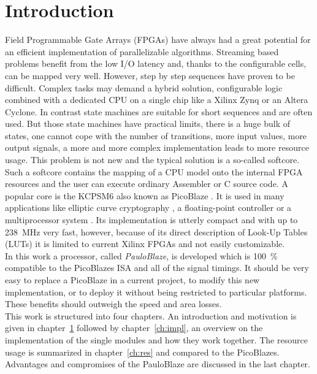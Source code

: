 \chapter{Introduction}
\label{ch:intro}

Field Programmable Gate Arrays (FPGAs) have always had a great potential for an efficient implementation of parallelizable algorithms.
Streaming based problems benefit from the low I/O latency and, thanks to the configurable cells, can be mapped very well.
However, step by step sequences have proven to be difficult. 
Complex tasks may demand a hybrid solution, configurable logic combined with a dedicated CPU on a single chip like a Xilinx Zynq or an Altera Cyclone.
In contrast state machines are suitable for short sequences and are often used.
But those state machines have practical limits, there is a huge bulk of states, one cannot cope with the number of transitions, more input values, more output signals, a more and more complex implementation leads to more resource usage.
This problem is not new and the typical solution is a so-called softcore.
Such a softcore contains the mapping of a CPU model onto the internal FPGA resources and the user can execute ordinary Assembler or C source code.
A popular core is the KCPSM6 also known as PicoBlaze \cite{PicoBlaze}. It is used in many applications like elliptic curve cryptography \cite{ref_elliptic}, a floating-point controller \cite{kadlec2005floating} or a multiprocessor system \cite{ref_paral_exec}.
Its implementation is utterly compact and with up to \SI{238}{\mega\hertz} very fast, however, because of its direct description of Look-Up Tables (LUTs) it is limited to current Xilinx FPGAs and not easily customizable.
\\ 
In this work a processor, called \textit{PauloBlaze}, is developed which is \SI{100}{\percent} compatible to the PicoBlazes ISA and all of the signal timings.
It should be very easy to replace a PicoBlaze in a current project, to modify this new implementation, or to deploy it without being restricted to particular platforms.
These benefits should outweigh the speed and area losses.
\\
This work is structured into four chapters.
An introduction and motivation is given in chapter~\ref{ch:intro} followed by chapter~\ref{ch:impl}, an overview on the implementation of the single modules and how they work together.
The resource usage is summarized in chapter~\ref{ch:res} and compared to the PicoBlazes.
Advantages and compromises of the PauloBlaze are discussed in the last chapter.
